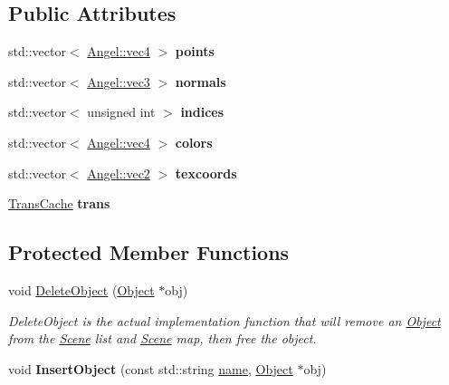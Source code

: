 \subsection*{Public Attributes}
\begin{DoxyCompactItemize}
\item 
\hypertarget{class_object_a8dec70177d147f59ba10c9eba8e9191b}{std\-::vector$<$ \hyperlink{struct_angel_1_1vec4}{Angel\-::vec4} $>$ {\bfseries points}}\label{class_object_a8dec70177d147f59ba10c9eba8e9191b}

\item 
\hypertarget{class_object_ad541a7bb180e24f59d752cc6d7f8c7e8}{std\-::vector$<$ \hyperlink{struct_angel_1_1vec3}{Angel\-::vec3} $>$ {\bfseries normals}}\label{class_object_ad541a7bb180e24f59d752cc6d7f8c7e8}

\item 
\hypertarget{class_object_a9b2fb19d129ad79407f9af0eea05b96c}{std\-::vector$<$ unsigned int $>$ {\bfseries indices}}\label{class_object_a9b2fb19d129ad79407f9af0eea05b96c}

\item 
\hypertarget{class_object_a4de4c1e2c4b621efb6f5d1b398ac6835}{std\-::vector$<$ \hyperlink{struct_angel_1_1vec4}{Angel\-::vec4} $>$ {\bfseries colors}}\label{class_object_a4de4c1e2c4b621efb6f5d1b398ac6835}

\item 
\hypertarget{class_object_a6d6c58ccb93f7a2bd7439d081134aaa0}{std\-::vector$<$ \hyperlink{struct_angel_1_1vec2}{Angel\-::vec2} $>$ {\bfseries texcoords}}\label{class_object_a6d6c58ccb93f7a2bd7439d081134aaa0}

\item 
\hypertarget{class_object_a1bb011587e4fa6e69984d5679546b1cb}{\hyperlink{class_trans_cache}{Trans\-Cache} {\bfseries trans}}\label{class_object_a1bb011587e4fa6e69984d5679546b1cb}

\end{DoxyCompactItemize}
\subsection*{Protected Member Functions}
\begin{DoxyCompactItemize}
\item 
void \hyperlink{class_scene_a8bbe0e5b1bfc71034b18e240e86aa285}{Delete\-Object} (\hyperlink{class_object}{Object} $\ast$obj)
\begin{DoxyCompactList}\small\item\em Delete\-Object is the actual implementation function that will remove an \hyperlink{class_object}{Object} from the \hyperlink{class_scene}{Scene} list and \hyperlink{class_scene}{Scene} map, then free the object. \end{DoxyCompactList}\item 
\hypertarget{class_scene_ae8d51ddc196248a7cbd1f3640851dbd4}{void {\bfseries Insert\-Object} (const std\-::string \hyperlink{class_object_a24457e0a387492c80594aec7681a2277}{name}, \hyperlink{class_object}{Object} $\ast$obj)}\label{class_scene_ae8d51ddc196248a7cbd1f3640851dbd4}

\end{DoxyCompactItemize}
